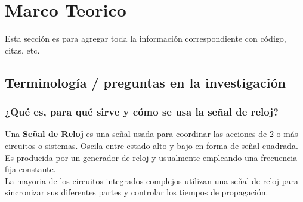 \documentclass{article}
\begin{document}
\section{Marco Teorico} \label{investigación}
Esta sección es para agregar toda la información correspondiente con código, citas, etc.

\subsection{Terminología / preguntas en la investigación}
\subsubsection*{¿Qué es, para qué sirve y cómo se usa la señal de reloj?}
Una \textbf{Señal de Reloj} \cite{SeñalReloj} es una señal usada para coordinar las acciones de 2 o más circuitos o sistemas. Oscila entre estado alto y bajo en forma de señal cuadrada. 
\\[0.2cm]
Es producida por un generador de reloj y usualmente empleando una frecuencia fija constante.
\\[0.2cm]
La mayoria de los circuitos integrados complejos utilizan una señal de reloj para sincronizar sus diferentes partes y controlar los tiempos de propagación.
\end{document}
